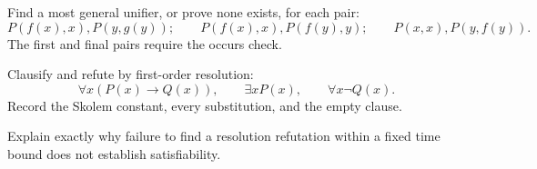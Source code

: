 \begin{exercise}
\label{ex:fol-cardinality-normalforms-08}
Find a most general unifier, or prove none exists, for each pair:
\[
 P(f(x),x),P(y,g(y));
 \qquad
 P(f(x),x),P(f(y),y);
 \qquad
 P(x,x),P(y,f(y)).
\]
The first and final pairs require the occurs check.
\end{exercise}

\begin{exercise}
\label{ex:fol-cardinality-normalforms-09}
Clausify and refute by first-order resolution:
\[
 \forall x(P(x)\to Q(x)),
 \qquad
 \exists xP(x),
 \qquad
 \forall x\neg Q(x).
\]
Record the Skolem constant, every substitution, and the empty clause.
\end{exercise}

\begin{exercise}
\label{ex:fol-cardinality-normalforms-10}
Explain exactly why failure to find a resolution refutation within
a fixed time bound does not establish satisfiability.
\end{exercise}
